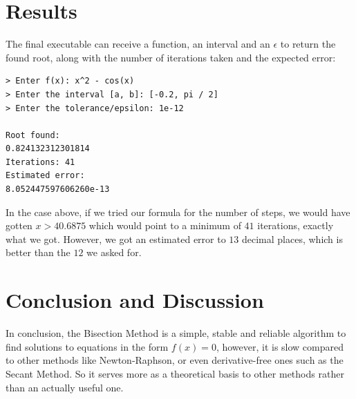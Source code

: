 \documentclass[12pt]{article}
\theoremstyle{plain}
\begin{document}
\section{Results}\label{sec:results}

The final executable can receive a function, an interval and an $\epsilon$ to return the found root, along with the number of iterations taken and the expected error:
\begin{lstlisting}[caption={Sample execution of the program},label={lst:sample-run}]
> Enter f(x): x^2 - cos(x)
> Enter the interval [a, b]: [-0.2, pi / 2]
> Enter the tolerance/epsilon: 1e-12

Root found:
0.824132312301814
Iterations: 41
Estimated error:
8.052447597606260e-13
\end{lstlisting}

In the case above, if we tried our formula for the number of steps, we would have gotten $x > 40.6875$ which would point to a minimum of $41$ iterations, exactly what we got. However, we got an estimated error to $13$ decimal places, which is better than the $12$ we asked for.

\section{Conclusion and Discussion}\label{sec:conlusion}

In conclusion, the Bisection Method is a simple, stable and reliable algorithm to find solutions to equations in the form $f(x) = 0$, however, it is slow compared to other methods like Newton-Raphson, or even derivative-free ones such as the Secant Method. So it serves more as a theoretical basis to other methods rather than an actually useful one.



\end{document}
